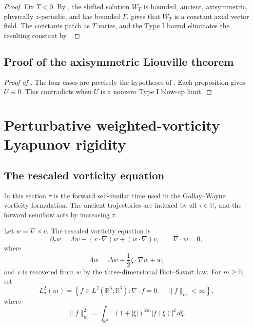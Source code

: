\documentclass[11pt]{amsart}
\theoremstyle{plain}
\theoremstyle{definition}
\theoremstyle{remark}
\numberwithin{equation}{section}
\begin{document}
\begin{proof}
Fix \(T<0\).  By , the shifted solution \(W_T\) is
bounded, ancient, axisymmetric, physically \(z\)-periodic, and has bounded
\(\Gamma\).   gives that \(W_T\) is a constant axial vector
field.  The constants patch as \(T\) varies, and the Type I bound eliminates
the resulting constant by .
\end{proof}

\subsection{Proof of the axisymmetric Liouville theorem}

\begin{proof}[Proof of ]
The four cases are precisely the hypotheses of
.
Each proposition gives \(U\equiv0\).  This contradicts
 when \(U\) is a nonzero Type I blow-up limit.
\end{proof}

\section{Perturbative weighted-vorticity Lyapunov rigidity}
\label{sec:weighted-vorticity}

\subsection{The rescaled vorticity equation}

In this section \(\tau\) is the forward self-similar time used in the
Gallay--Wayne vorticity formulation.  The ancient trajectories are indexed by
all \(\tau\in\mathbb R\), and the forward semiflow acts by increasing
\(\tau\).

Let \(w=\nabla\times v\).  The rescaled vorticity equation is
\begin{equation}\label{eq:weighted-vorticity}
   \partial_\tau w
   =
   \Lambda w-(v\cdot\nabla)w+(w\cdot\nabla)v,
   \qquad \nabla\cdot w=0,
\end{equation}
where
\begin{equation}\label{eq:lambda}
   \Lambda w=\Delta w+\frac12\xi\cdot\nabla w+w,
\end{equation}
and \(v\) is recovered from \(w\) by the three-dimensional Biot--Savart law.
For \(m\ge0\), set
\[
   L^2_\sigma(m)
   =
   \left\{
      f\in L^2(\mathbb R^3;\mathbb R^3):
      \nabla\cdot f=0,\quad \|f\|_m<\infty
   \right\},
\]
where
\[
   \|f\|_m^2
   =
   \int_{\mathbb R^3}(1+|\xi|)^{2m}|f(\xi)|^2\,d\xi .
\]
\end{document}
